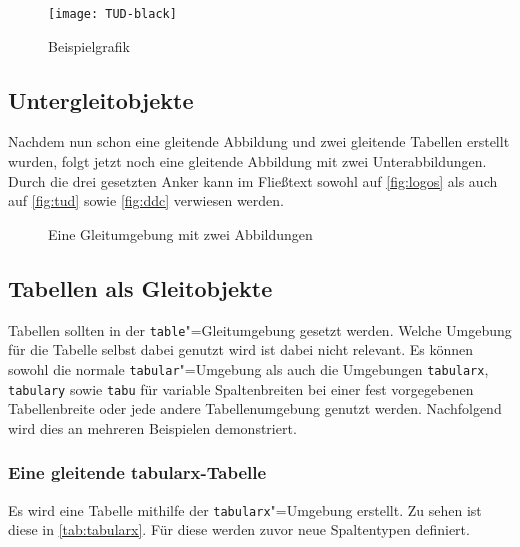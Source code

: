 \begin{figure}
\centering
\texttt{[image: TUD-black]}
\caption{Beispielgrafik}\label{fig:example}
\end{figure}

\subsection{Untergleitobjekte}
Nachdem nun schon eine gleitende Abbildung und zwei gleitende Tabellen
erstellt wurden, folgt jetzt noch eine gleitende Abbildung mit zwei
Unterabbildungen. Durch die drei gesetzten Anker kann im Fließtext
sowohl auf \autoref{fig:logos} als auch auf \autoref{fig:tud} sowie
\autoref{fig:ddc} verwiesen werden.

\begin{figure}
%
  {\caption{Eine Gleitumgebung mit zwei Abbildungen}\label{fig:logos}}%
\end{figure}

\subsection{Tabellen als Gleitobjekte}
Tabellen sollten in der \texttt{table}"=Gleitumgebung gesetzt werden.
Welche Umgebung für die Tabelle selbst dabei genutzt wird ist dabei
nicht relevant. Es können sowohl die normale \texttt{tabular}"=Umgebung
als auch die Umgebungen \texttt{tabularx}, \texttt{tabulary} sowie
\texttt{tabu} für variable Spaltenbreiten bei einer fest vorgegebenen
Tabellenbreite oder jede andere Tabellenumgebung genutzt werden.
Nachfolgend wird dies an mehreren Beispielen demonstriert.

\subsubsection{Eine gleitende tabularx-Tabelle}
Es wird eine Tabelle mithilfe der \texttt{tabularx}"=Umgebung erstellt.
Zu sehen ist diese in \autoref{tab:tabularx}. Für diese werden zuvor
neue Spaltentypen definiert.


